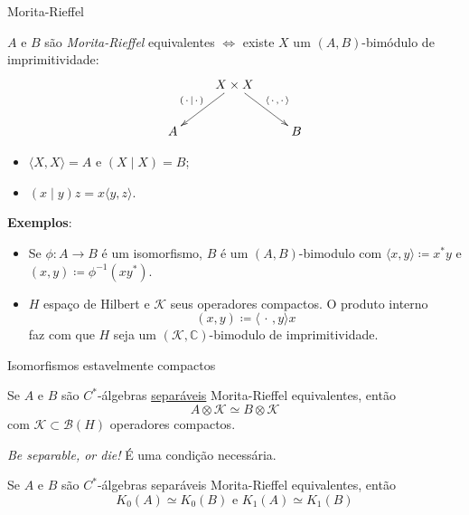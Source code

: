 \documentclass[9pt, compress]{beamer}
\begin{document}
{\begin{frame}{Morita-Rieffel}
    \begin{definicao}
        $A$ e $B$ são \textit{Morita-Rieffel} equivalentes $\Leftrightarrow$ existe $X$ um $(A,B)$-bimódulo de imprimitividade: \pause
        \begin{equation*}
        \xymatrix{
         & X \times X \ar[ld]_{(\,\cdot\,\mid\,\cdot\,)} \ar[rd]^{\langle\,\cdot\,,\,\cdot\,\rangle}
         &  \\
        A & & B\\
        }
        \end{equation*}
        \pause
        \begin{itemize}
            \item $\langle X, X\rangle = A$ e $(X\mid X) = B$;\pause
            \item $(x\mid y) z = x \langle y, z\rangle$.
        \end{itemize}
    \end{definicao}\pause
    \textbf{Exemplos}:
    \begin{itemize}
        \item Se $\phi:A\longrightarrow B$ é um isomorfismo, $B$ é um $(A,B)$-bimodulo com $\langle x,y\rangle \coloneqq x^*y$ e $(x,y)\coloneqq \phi^{-1}(xy^*)$. \pause
        \item $H$ espaço de Hilbert e $\mathscr K$ seus operadores compactos. O produto interno
        $$(x,y) \coloneqq \langle\,\cdot\,,y\rangle x$$
        faz com que $H$ seja um $(\mathscr K,\mathbb C)$-bimodulo de imprimitividade.
    \end{itemize}
\end{frame}

\begin{frame}{Isomorfismos estavelmente compactos}
    \begin{teorema}
        Se $A$ e $B$ são $C^*$-álgebras \underline{separáveis} Morita-Rieffel equivalentes, então
        $$A \otimes \mathscr K \simeq B \otimes \mathscr K$$
        com $\mathscr K\subset \mathscr B(H)$ operadores compactos.
    \end{teorema}
    \pause
    \textit{Be separable, or die!} É uma condição necessária.
    \pause
    \begin{corolario}
        Se $A$ e $B$ são $C^*$-álgebras {separáveis} Morita-Rieffel equivalentes, então
        $$K_0(A) \simeq K_0(B) \text{ e } K_1(A) \simeq K_1(B)$$
    \end{corolario}
\end{frame}

}
\end{document}
